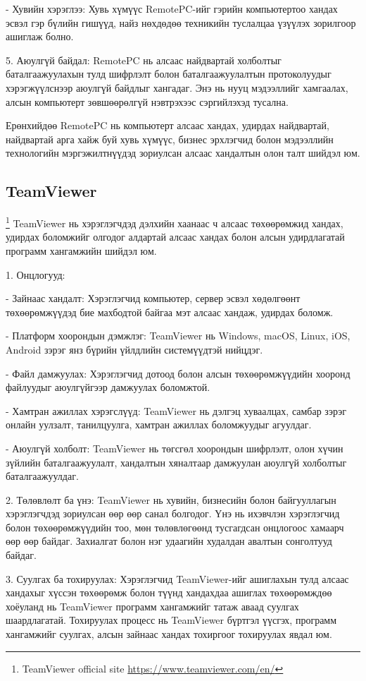 - Хувийн хэрэглээ: Хувь хүмүүс RemotePC-ийг гэрийн компьютертоо хандах эсвэл гэр бүлийн гишүүд, найз нөхдөдөө техникийн туслалцаа үзүүлэх зорилгоор ашиглаж болно.

5. Аюулгүй байдал: RemotePC нь алсаас найдвартай холболтыг баталгаажуулахын тулд шифрлэлт болон баталгаажуулалтын протоколуудыг хэрэгжүүлснээр аюулгүй байдлыг хангадаг. Энэ нь нууц мэдээллийг хамгаалах, алсын компьютерт зөвшөөрөлгүй нэвтрэхээс сэргийлэхэд тусална.

Ерөнхийдөө RemotePC нь компьютерт алсаас хандах, удирдах найдвартай, найдвартай арга хайж буй хувь хүмүүс, бизнес эрхлэгчид болон мэдээллийн технологийн мэргэжилтнүүдэд зориулсан алсаас хандалтын олон талт шийдэл юм.
\pagebreak

\subsection{TeamViewer}
\footnote{TeamViewer official site \url{https://www.teamviewer.com/en/}}
	\quad \quad TeamViewer нь хэрэглэгчдэд дэлхийн хаанаас ч алсаас төхөөрөмжид хандах, удирдах боломжийг олгодог алдартай алсаас хандах болон алсын удирдлагатай программ хангамжийн шийдэл юм.

1. Онцлогууд: 

	- Зайнаас хандалт: Хэрэглэгчид компьютер, сервер эсвэл хөдөлгөөнт төхөөрөмжүүдэд бие махбодтой байгаа мэт алсаас хандаж, удирдах боломж.

	- Платформ хоорондын дэмжлэг: TeamViewer нь Windows, macOS, Linux, iOS, Android зэрэг янз бүрийн үйлдлийн системүүдтэй нийцдэг.

	- Файл дамжуулах: Хэрэглэгчид дотоод болон алсын төхөөрөмжүүдийн хооронд файлуудыг аюулгүйгээр дамжуулах боломжтой.

	- Хамтран ажиллах хэрэгслүүд: TeamViewer нь дэлгэц хуваалцах, самбар зэрэг онлайн уулзалт, танилцуулга, хамтран ажиллах боломжуудыг агуулдаг.

	- Аюулгүй холболт: TeamViewer нь төгсгөл хоорондын шифрлэлт, олон хүчин зүйлийн баталгаажуулалт, хандалтын хяналтаар дамжуулан аюулгүй холболтыг баталгаажуулдаг.

2. Төлөвлөлт ба үнэ: TeamViewer нь хувийн, бизнесийн болон байгууллагын хэрэглэгчдэд зориулсан өөр өөр санал болгодог. Үнэ нь ихэвчлэн хэрэглэгчид болон төхөөрөмжүүдийн тоо, мөн төлөвлөгөөнд тусгагдсан онцлогоос хамаарч өөр өөр байдаг. Захиалгат болон нэг удаагийн худалдан авалтын сонголтууд байдаг.

3. Суулгах ба тохируулах: Хэрэглэгчид TeamViewer-ийг ашиглахын тулд алсаас хандахыг хүссэн төхөөрөмж болон түүнд хандахдаа ашиглах төхөөрөмждөө хоёуланд нь TeamViewer программ хангамжийг татаж аваад суулгах шаардлагатай. Тохируулах процесс нь TeamViewer бүртгэл үүсгэх, программ хангамжийг суулгах, алсын зайнаас хандах тохиргоог тохируулах явдал юм.

